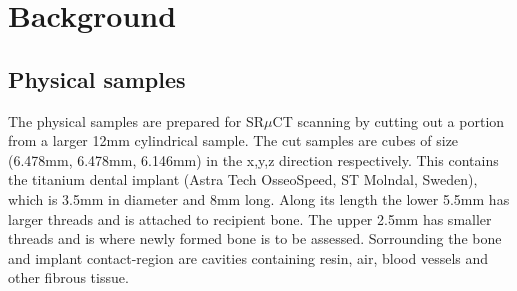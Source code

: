\section{Background}
\label{sec:background}

\subsection{Physical samples}

The physical samples are prepared for SR$\mu$CT scanning by cutting out a portion from a larger
12mm cylindrical sample.  The cut samples are cubes of size
(6.478mm, 6.478mm, 6.146mm) in the x,y,z direction respectively. This contains the titanium dental
implant (Astra Tech OsseoSpeed, ST Molndal, Sweden), which is 3.5mm in diameter and 8mm long. Along
its length the lower 5.5mm has larger threads and is attached to recipient bone. The upper 2.5mm
has smaller threads and is where newly formed bone is to be assessed. Sorrounding the bone and
implant contact-region are cavities containing resin, air, blood vessels and other fibrous tissue.

